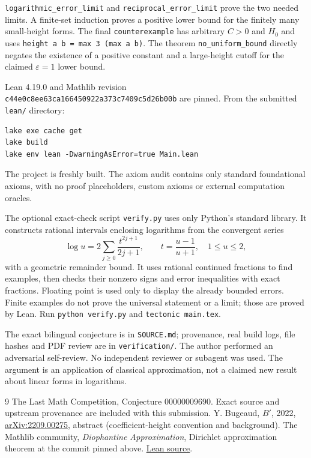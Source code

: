\documentclass[11pt]{article}
\begin{document}
\texttt{logarithmic\_error\_limit} and
\texttt{reciprocal\_error\_limit} prove the two needed
limits. A finite-set induction proves a positive lower
bound for the finitely many small-height forms. The final
\texttt{counterexample} has arbitrary $C>0$ and $H_0$ and
uses \texttt{height a b = max 3 (max a b)}. The theorem
\texttt{no\_uniform\_bound} directly negates the existence
of a positive constant and a large-height cutoff for the
claimed $\varepsilon=1$ lower bound.

Lean 4.19.0 and Mathlib revision\\
\texttt{c44e0c8ee63ca166450922a373c7409c5d26b00b}
are pinned. From the submitted \texttt{lean/} directory:
\begin{verbatim}
lake exe cache get
lake build
lake env lean -DwarningAsError=true Main.lean
\end{verbatim}
The project is freshly built. The axiom audit contains only
standard foundational axioms, with no proof placeholders,
custom axioms or external computation oracles.

The optional exact-check script \texttt{verify.py} uses
only Python's standard library. It constructs rational
intervals enclosing logarithms from the convergent series
\[
 \log u=2\sum_{j\geq0}\frac{t^{2j+1}}{2j+1},
 \qquad t=\frac{u-1}{u+1},\quad 1\leq u\leq2,
\]
with a geometric remainder bound. It uses rational
continued fractions to find examples, then checks their
nonzero signs and error inequalities with exact fractions.
Floating point is used only to display the already bounded
errors. Finite examples do not prove the universal statement
or a limit; those are proved by Lean. Run
\texttt{python verify.py} and \texttt{tectonic main.tex}.

The exact bilingual conjecture is in \texttt{SOURCE.md};
provenance, real build logs, file hashes and PDF review are
in \texttt{verification/}. The author performed an adversarial
self-review. No independent reviewer or subagent was used.
The argument is an application of classical approximation,
not a claimed new result about linear forms in logarithms.

\begin{thebibliography}{9}
 The Last Math Competition,
Conjecture 00000009690. Exact source and upstream provenance
are included with this submission.
 Y. Bugeaud, \emph{$B'$}, 2022,
\href{https://arxiv.org/abs/2209.00275}{arXiv:2209.00275},
abstract (coefficient-height convention and background).
 The Mathlib community,
\emph{Diophantine Approximation}, Dirichlet approximation
theorem at the commit pinned above.
\href{https://github.com/leanprover-community/mathlib4/blob/c44e0c8ee63ca166450922a373c7409c5d26b00b/Mathlib/NumberTheory/DiophantineApproximation/Basic.lean}{Lean source}.
\end{thebibliography}
\end{document}
